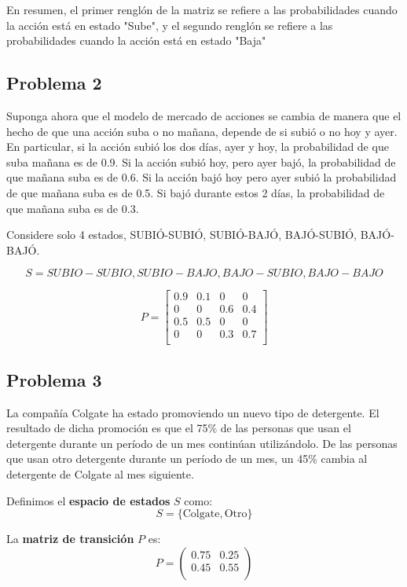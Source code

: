 \documentclass{article}
\begin{document}
En resumen, el primer renglón de la matriz se refiere a las probabilidades cuando la acción está en estado "Sube", y el segundo renglón se refiere a las probabilidades cuando la acción está en estado "Baja"

\subsection*{Problema 2}

Suponga ahora que el modelo de mercado de acciones se cambia de manera que el hecho de que una acción suba o no mañana, depende de si subió o no hoy y ayer. En particular, si la acción subió los dos días, ayer y hoy, la probabilidad de que suba mañana es de 0.9. Si la acción subió hoy, pero ayer bajó, la probabilidad de que mañana suba es de 0.6. Si la acción bajó hoy pero ayer subió la probabilidad de que mañana suba es de 0.5. Si bajó durante estos 2 días, la probabilidad de que mañana suba es de 0.3.

Considere solo 4 estados, SUBIÓ-SUBIÓ, SUBIÓ-BAJÓ, BAJÓ-SUBIÓ, BAJÓ-BAJÓ.

\[S={SUBIO-SUBIO,SUBIO-BAJO,BAJO-SUBIO,BAJO-BAJO}\]

\[
    P = \begin{bmatrix}
        0.9 & 0.1 & 0   & 0   \\
        0   & 0   & 0.6 & 0.4 \\
        0.5 & 0.5 & 0   & 0   \\
        0   & 0   & 0.3 & 0.7 \\
    \end{bmatrix}
\]

\subsection*{Problema 3}

La compañía Colgate ha estado promoviendo un nuevo tipo de detergente. El resultado de dicha promoción es que el 75\% de las personas que usan el detergente durante un período de un mes continúan utilizándolo. De las personas que usan otro detergente durante un período de un mes, un 45\% cambia al detergente de Colgate al mes siguiente.


Definimos el \textbf{espacio de estados} \( S \) como:
\[ S = \{ \text{Colgate}, \text{Otro} \} \]

La \textbf{matriz de transición} \( P \) es:
\[
    P = \begin{pmatrix}
        0.75 & 0.25 \\
        0.45 & 0.55 \\
    \end{pmatrix}
\]
\end{document}
